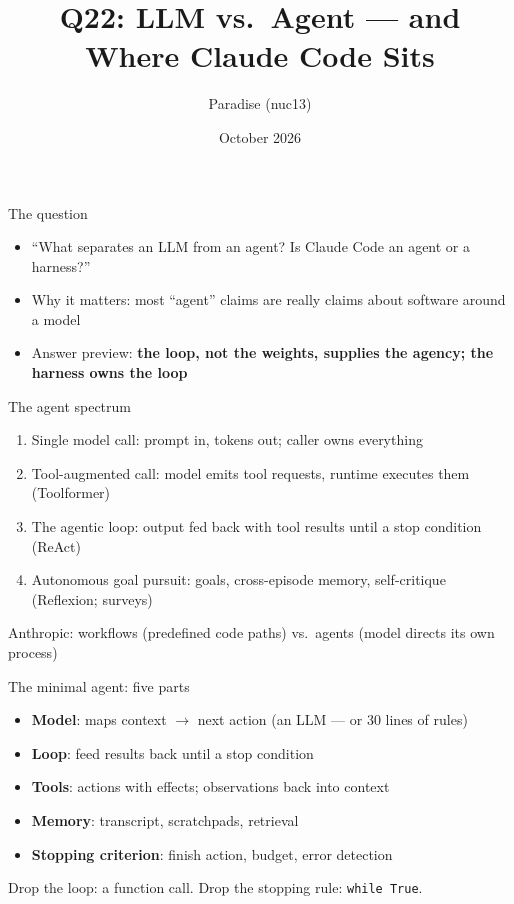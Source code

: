 \documentclass[aspectratio=169,11pt]{beamer}
\title{Q22: LLM vs.\ Agent --- and Where Claude Code Sits}
\author{Paradise (nuc13)}
\date{October 2026}
\begin{document}
\frame{\titlepage}

\begin{frame}{The question}
\begin{itemize}
\item ``What separates an LLM from an agent? Is Claude Code an agent or a harness?''
\item Why it matters: most ``agent'' claims are really claims about software around a model
\item Answer preview: \textbf{the loop, not the weights, supplies the agency; the harness owns the loop}
\end{itemize}
\end{frame}

\begin{frame}{The agent spectrum}
\begin{enumerate}
\item Single model call: prompt in, tokens out; caller owns everything
\item Tool-augmented call: model emits tool requests, runtime executes them (Toolformer)
\item The agentic loop: output fed back with tool results until a stop condition (ReAct)
\item Autonomous goal pursuit: goals, cross-episode memory, self-critique (Reflexion; surveys)
\end{enumerate}
\vspace{0.4em}
Anthropic: workflows (predefined code paths) vs.\ agents (model directs its own process)
\end{frame}

\begin{frame}{The minimal agent: five parts}
\begin{itemize}
\item \textbf{Model}: maps context $\to$ next action (an LLM --- or 30 lines of rules)
\item \textbf{Loop}: feed results back until a stop condition
\item \textbf{Tools}: actions with effects; observations back into context
\item \textbf{Memory}: transcript, scratchpads, retrieval
\item \textbf{Stopping criterion}: finish action, budget, error detection
\end{itemize}
\vspace{0.4em}
Drop the loop: a function call. Drop the stopping rule: \texttt{while True}.
\end{frame}
\end{document}
